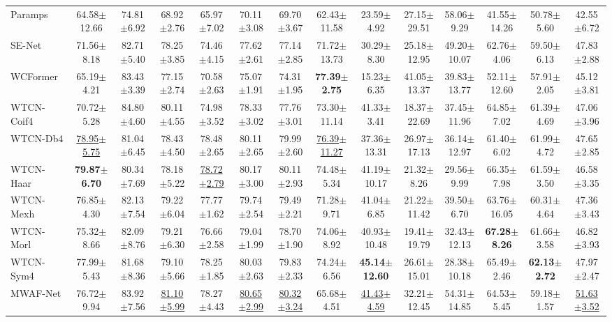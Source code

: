 \begin{table}[!t]
{{\begin{tabular}{lcccccc|ccccccc}
Paramps~\cite{Paramps} & 64.58$\pm$12.66 & 74.81$\pm$6.92 & 68.92$\pm$2.76 & 65.97$\pm$7.02 & 70.11$\pm$3.08 & 69.70$\pm$3.67 & 62.43$\pm$11.58 & 23.59$\pm$4.92 & 27.15$\pm$29.51 & 58.06$\pm$9.29 & 41.55$\pm$14.26 & 50.78$\pm$5.60 & 42.55$\pm$6.72 \\
SE-Net~\cite{SE-Net} & 71.56$\pm$8.18 & 82.71$\pm$5.40 & 78.25$\pm$3.85 & 74.46$\pm$4.15 & 77.62$\pm$2.61 & 77.14$\pm$2.85 & 71.72$\pm$13.73 & 30.29$\pm$8.30 & 25.18$\pm$12.95 & 49.20$\pm$10.07 & 62.76$\pm$4.06 & 59.50$\pm$6.13 & 47.83$\pm$2.88 \\
WCFormer~\cite{WCFormer} & 65.19$\pm$4.21 & 83.43$\pm$3.39 & 77.15$\pm$2.74 & 70.58$\pm$2.63 & 75.07$\pm$1.91 & 74.31$\pm$1.95 & \textbf{77.39$\pm$2.75} & 15.23$\pm$6.35 & 41.05$\pm$13.37 & 39.83$\pm$13.77 & 52.11$\pm$12.60 & 57.91$\pm$2.05 & 45.12$\pm$3.81 \\
\midrule
WTCN-Coif4 & 70.72$\pm$5.28 & 84.80$\pm$4.60 & 80.11$\pm$4.55 & 74.98$\pm$3.52 & 78.33$\pm$3.02 & 77.76$\pm$3.01 & 73.30$\pm$11.14 & 41.33$\pm$3.41 & 18.37$\pm$22.69 & 37.45$\pm$11.96 & 64.85$\pm$7.02 & 61.39$\pm$4.69 & 47.06$\pm$3.96 \\
WTCN-Db4 & \underline{78.95$\pm$5.75} & 81.04$\pm$6.45 & 78.43$\pm$4.50 & 78.48$\pm$2.65 & 80.11$\pm$2.65 & 79.99$\pm$2.60 & \underline{76.39$\pm$11.27} & 37.36$\pm$13.31 & 26.97$\pm$17.13 & 36.14$\pm$12.97 & 61.40$\pm$6.02 & 61.99$\pm$4.72 & 47.65$\pm$2.85 \\
WTCN-Haar & \textbf{79.87$\pm$6.70} & 80.34$\pm$7.69 & 78.18$\pm$5.22 & \underline{78.72$\pm$2.79} & 80.17$\pm$3.00 & 80.11$\pm$2.93 & 74.48$\pm$5.34 & 41.19$\pm$10.17 & 21.32$\pm$8.26 & 29.56$\pm$9.99 & 66.35$\pm$7.98 & 61.59$\pm$3.50 & 46.58$\pm$3.35 \\
WTCN-Mexh & 76.85$\pm$4.30 & 82.13$\pm$7.54 & 79.22$\pm$6.04 & 77.77$\pm$1.62 & 79.74$\pm$2.54 & 79.49$\pm$2.21 & 71.28$\pm$9.71 & 41.04$\pm$6.85 & 21.22$\pm$11.42 & 39.50$\pm$6.70 & 63.76$\pm$16.05 & 60.31$\pm$4.64 & 47.36$\pm$3.43 \\
WTCN-Morl & 75.32$\pm$8.66 & 82.09$\pm$8.76 & 79.21$\pm$6.30 & 76.66$\pm$2.58 & 79.04$\pm$1.99 & 78.70$\pm$1.90 & 74.06$\pm$8.92 & 40.93$\pm$10.48 & 19.41$\pm$19.79 & 32.43$\pm$12.13 & \textbf{67.28$\pm$8.26} & 61.66$\pm$3.58 & 46.82$\pm$3.93 \\
WTCN-Sym4 & 77.99$\pm$5.43 & 81.68$\pm$8.36 & 79.10$\pm$5.66 & 78.25$\pm$1.85 & 80.03$\pm$2.63 & 79.83$\pm$2.33 & 74.24$\pm$6.56 & \textbf{45.14$\pm$12.60} & 26.61$\pm$15.01 & 28.38$\pm$10.18 & 65.49$\pm$2.46 & \textbf{62.13$\pm$2.72} & 47.97$\pm$2.47 \\
\midrule
MWAF-Net & 76.72$\pm$9.94 & 83.92$\pm$7.56 & \underline{81.10$\pm$5.99} & 78.27$\pm$4.43 & \underline{80.65$\pm$2.99} & \underline{80.32$\pm$3.24} &
65.68$\pm$4.51 & \underline{41.43$\pm$4.59} & 32.21$\pm$12.45 & 54.31$\pm$14.85 & 64.53$\pm$5.45 & 59.18$\pm$1.57 & \underline{51.63$\pm$3.52} \\
\bottomrule\end{tabular}}}
\end{table}